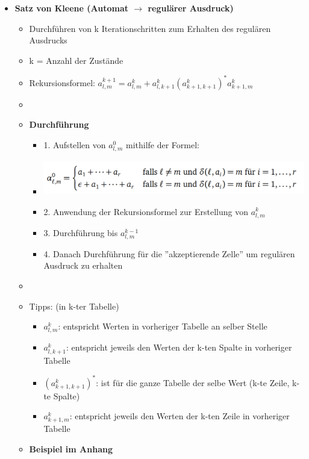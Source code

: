 \documentclass[11pt,a4paper]{article}
\begin{document}
\begin{itemize}
\begin{itemize}
	\end{itemize}

\pagebreak

\item {\large \textbf{Satz von Kleene (Automat $\rightarrow$ regulärer Ausdruck)}}
	\begin{itemize}
	\item Durchführen von k Iterationschritten zum Erhalten des regulären Ausdrucks
	\item k = Anzahl der Zustände
	\item Rekursionsformel: $a^{k+1}_{l,m} = a^k_{l,m} + a^k_{l,k+1}(a^k_{k+1,k+1})^*a^k_{k+1,m}$
	\item[]
	\item \textbf{Durchführung}
		\begin{itemize}		
		\item 1. Aufstellen von $a^0_{l,m}$ mithilfe der Formel:
		\item[]
			\begin{center}
			\includegraphics[height=1.5cm]{Bilder/kleene1}
			\end{center}
		\item 2. Anwendung der Rekursionsformel zur Erstellung von $a^k_{l,m}$
		\item 3. Durchführung bis $a^{k-1}_{l,m}$
		\item 4. Danach Durchführung für die ''akzeptierende Zelle'' um regulären Ausdruck zu erhalten
	\end{itemize}
	\item[]
	\item Tipps: (in k-ter Tabelle)
		\begin{itemize}
		\item $a^k_{l,m}$:			entspricht Werten in vorheriger Tabelle an selber Stelle
		\item $a^k_{l,k+1}$:		entspricht jeweils den Werten der k-ten Spalte in vorheriger Tabelle
		\item $(a^k_{k+1,k+1})^*$: ist für die ganze Tabelle der selbe Wert (k-te Zeile, k-te Spalte)
		\item $a^k_{k+1,m}$:		entspricht jeweils den Werten der k-ten Zeile in vorheriger Tabelle
		\end{itemize}
	\item \textbf{Beispiel im Anhang}
	

\end{itemize}
\end{itemize}
\end{document}
